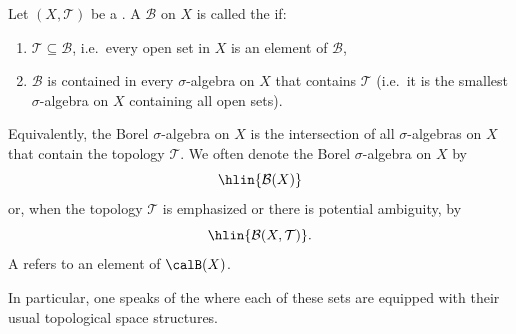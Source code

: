 \begin{definition} \label{definition:borel_sigma_algebra_of_a_topological_space}
Let $(X,\mathcal{T})$ be a .
    A  $\mathcal{B}$ on $X$ is called the  if:

    \begin{enumerate}
    \item $\mathcal{T} \subseteq \mathcal{B}$, i.e.\ every open set in $X$ is an element of $\mathcal{B}$,

    \item $\mathcal{B}$ is contained in every $\sigma$-algebra on $X$ that contains $\mathcal{T}$ (i.e.\ it is the smallest $\sigma$-algebra on $X$ containing all open sets).
    \end{enumerate}

    Equivalently, the Borel $\sigma$-algebra on $X$ is the intersection of all $\sigma$-algebras on $X$ that contain the topology $\mathcal{T}$.
    We often denote the Borel $\sigma$-algebra on $X$ by
    $$\hlin{\mathcal{B}(X)}$$
    or, when the topology $\mathcal{T}$ is emphasized or there is potential ambiguity, by
    $$\hlin{\mathcal{B}(X,\mathcal{T})}.$$
    A  refers to an element of $\calB(X)$.

    In particular, one speaks of the  where each of these sets are equipped with their usual topological space structures.
\end{definition}